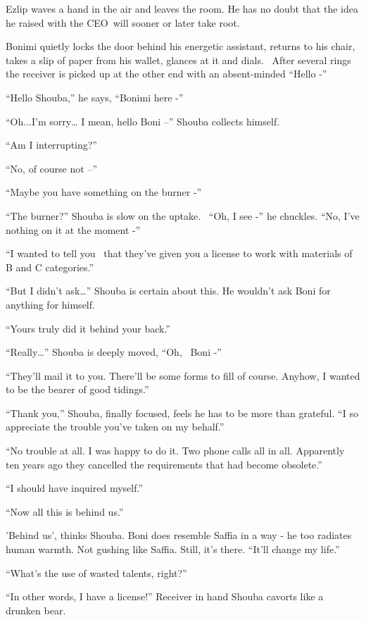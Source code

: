 \documentclass[twoside,11pt]{book}
\begin{document}
Ezlip waves a hand in the air and leaves the room. He has no doubt that the idea he raised with the CEO~will sooner or
later take root{. }

Bonimi quietly locks the door behind his energetic assistant, returns to his chair, takes a slip of paper from his
wallet, glances at it and dials.~ After several rings the receiver is picked up at the other end with an absent-minded
``Hello -''

``Hello Shouba,'' he says, ``Bonimi here -''

``Oh...I'm sorry{\dots} I mean, hello Boni --'' Shouba collects himself.

``Am I interrupting?''

``No, of course not --''

``Maybe you have something on the burner -''

``The burner?'' Shouba is slow on the uptake. ~``Oh, I see -'' he
chuckles. ``No, I've nothing on it at the moment -''

``I wanted to tell you \ that they've given you a license to work with materials of B and C
categories.''

``But I didn't ask{\dots}'' Shouba is certain about this. He wouldn't ask Boni for anything
for himself.

``Yours truly did it behind your back.''

``Really{\dots}'' Shouba is deeply moved, ``Oh, ~Boni -''

``They'll mail it to you. There'll be some forms to fill of course. Anyhow, I wanted to be the bearer of
good tidings.''

``Thank you,'' Shouba, finally focused, feels he has to be more than grateful.
``I so appreciate the trouble you've taken on my behalf.''

``No trouble at all. I was happy to do it. Two phone calls all in all. Apparently ten years ago they
cancelled the requirements that had become obsolete.''

``I should have inquired myself.''

``Now all this is behind us.''

{}'Behind us', thinks Shouba. Boni does resemble Saffia in a way - he too radiates human warmth. Not gushing like
Saffia. Still, it's there. ``It'll change my life.''

``What's the use of wasted talents, right?''

``In other words, I have a license!'' Receiver in hand Shouba cavorts like a drunken bear.
\end{document}
